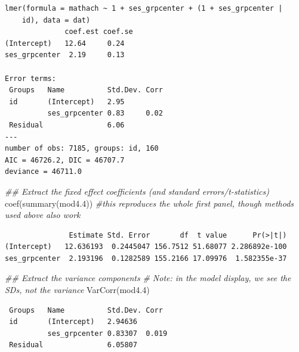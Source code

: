 \documentclass[
  letterpaper,
  DIV=11,
  numbers=noendperiod]{scrreprt}
\newenvironment{Shaded}{\begin{snugshade}}{\end{snugshade}}
\newcommand{\CommentTok}[1]{\textcolor[rgb]{0.38,0.63,0.69}{\textit{#1}}}
\newcommand{\DecValTok}[1]{\textcolor[rgb]{0.25,0.63,0.44}{#1}}
\newcommand{\DocumentationTok}[1]{\textcolor[rgb]{0.73,0.13,0.13}{\textit{#1}}}
\newcommand{\FloatTok}[1]{\textcolor[rgb]{0.25,0.63,0.44}{#1}}
\newcommand{\FunctionTok}[1]{\textcolor[rgb]{0.02,0.16,0.49}{#1}}
\newcommand{\NormalTok}[1]{\textcolor[rgb]{0.00,0.44,0.13}{#1}}
\newcommand{\SpecialCharTok}[1]{\textcolor[rgb]{0.25,0.44,0.63}{#1}}
\begin{document}
\begin{verbatim}
lmer(formula = mathach ~ 1 + ses_grpcenter + (1 + ses_grpcenter | 
    id), data = dat)
              coef.est coef.se
(Intercept)   12.64     0.24  
ses_grpcenter  2.19     0.13  

Error terms:
 Groups   Name          Std.Dev. Corr 
 id       (Intercept)   2.95          
          ses_grpcenter 0.83     0.02 
 Residual               6.06          
---
number of obs: 7185, groups: id, 160
AIC = 46726.2, DIC = 46707.7
deviance = 46711.0 
\end{verbatim}

\begin{Shaded}
\begin{Highlighting}[]
\DocumentationTok{\#\# Extract the fixed effect coefficients (and standard errors/t{-}statistics)}
\FunctionTok{coef}\NormalTok{(}\FunctionTok{summary}\NormalTok{(mod4}\FloatTok{.4}\NormalTok{)) }\CommentTok{\#this reproduces the whole first panel, though methods used above also work}
\end{Highlighting}
\end{Shaded}

\begin{verbatim}
               Estimate Std. Error       df  t value      Pr(>|t|)
(Intercept)   12.636193  0.2445047 156.7512 51.68077 2.286892e-100
ses_grpcenter  2.193196  0.1282589 155.2166 17.09976  1.582355e-37
\end{verbatim}

\begin{Shaded}
\begin{Highlighting}[]
\DocumentationTok{\#\# Extract the variance components}
\CommentTok{\# Note: in the model display, we see the SDs, not the variance}
\FunctionTok{VarCorr}\NormalTok{(mod4}\FloatTok{.4}\NormalTok{) }
\end{Highlighting}
\end{Shaded}

\begin{verbatim}
 Groups   Name          Std.Dev. Corr 
 id       (Intercept)   2.94636       
          ses_grpcenter 0.83307  0.019
 Residual               6.05807       
\end{verbatim}

\begin{Shaded}
\end{Shaded}
\end{document}
